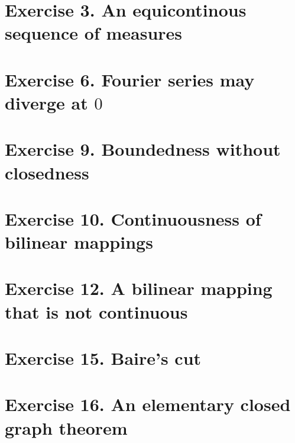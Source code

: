 %
\setcounter{section}{2}
%

\section{Exercise 3. An equicontinous sequence of measures}

\newpage
%
\setcounter{section}{5}
%
\section{Exercise 6. Fourier series may diverge at $0$}

\newpage
%
\setcounter{section}{8}
%
\section{Exercise 9. Boundedness without closedness}

\newpage
%
\section{Exercise 10. Continuousness of bilinear mappings}

\newpage
%
\setcounter{section}{11}
%
\section{Exercise 12. A bilinear mapping that is not continuous}

\newpage
%
\setcounter{section}{14}
%
\section{Exercise 15. Baire's cut}

\newpage
%
\section{Exercise 16. An elementary closed graph theorem}

